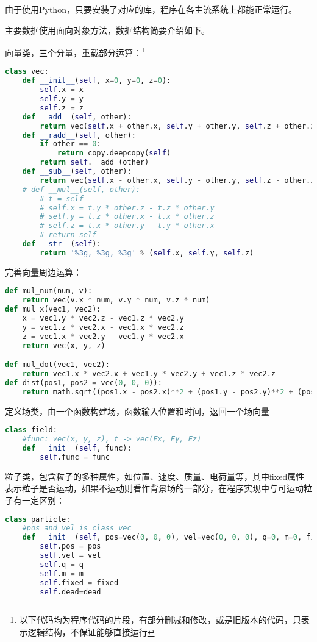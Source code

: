 \documentclass[UTF-8,cs4size]{ctexart}
\begin{document}
由于使用Python，只要安装了对应的库，程序在各主流系统上都能正常运行。


主要数据使用面向对象方法，数据结构简要介绍如下。


向量类，三个分量，重载部分运算：\footnote{以下代码均为程序代码的片段，有部分删减和修改，或是旧版本的代码，只表示逻辑结构，不保证能够直接运行}
\begin{lstlisting}[language=Python]
class vec:
    def __init__(self, x=0, y=0, z=0):
        self.x = x
        self.y = y
        self.z = z
    def __add__(self, other):
        return vec(self.x + other.x, self.y + other.y, self.z + other.z)
    def __radd__(self, other):
        if other == 0:
            return copy.deepcopy(self)
        return self.__add_(other)
    def __sub__(self, other):
        return vec(self.x - other.x, self.y - other.y, self.z - other.z)
    # def __mul__(self, other):
        # t = self
        # self.x = t.y * other.z - t.z * other.y
        # self.y = t.z * other.x - t.x * other.z
        # self.z = t.x * other.y - t.y * other.x
        # return self
    def __str__(self):
        return '%3g, %3g, %3g' % (self.x, self.y, self.z)
\end{lstlisting}
完善向量周边运算：
\begin{lstlisting}[language=Python]
def mul_num(num, v):
    return vec(v.x * num, v.y * num, v.z * num)
def mul_x(vec1, vec2):
    x = vec1.y * vec2.z - vec1.z * vec2.y
    y = vec1.z * vec2.x - vec1.x * vec2.z
    z = vec1.x * vec2.y - vec1.y * vec2.x
    return vec(x, y, z)

def mul_dot(vec1, vec2):
    return vec1.x * vec2.x + vec1.y * vec2.y + vec1.z * vec2.z
def dist(pos1, pos2 = vec(0, 0, 0)):
    return math.sqrt((pos1.x - pos2.x)**2 + (pos1.y - pos2.y)**2 + (pos1.z - pos2.z)**2)
\end{lstlisting}
定义场类，由一个函数构建场，函数输入位置和时间，返回一个场向量
\begin{lstlisting}[language=Python]
class field:
    #func: vec(x, y, z), t -> vec(Ex, Ey, Ez)
    def __init__(self, func):
        self.func = func
\end{lstlisting}
粒子类，包含粒子的多种属性，如位置、速度、质量、电荷量等，其中fixed属性表示粒子是否运动，如果不运动则看作背景场的一部分，在程序实现中与可运动粒子有一定区别：
\begin{lstlisting}[language=Python]
class particle:
    #pos and vel is class vec
    def __init__(self, pos=vec(0, 0, 0), vel=vec(0, 0, 0), q=0, m=0, fixed=0, dead=0):
        self.pos = pos
        self.vel = vel
        self.q = q
        self.m = m
        self.fixed = fixed
        self.dead=dead
\end{lstlisting}
\end{document}
